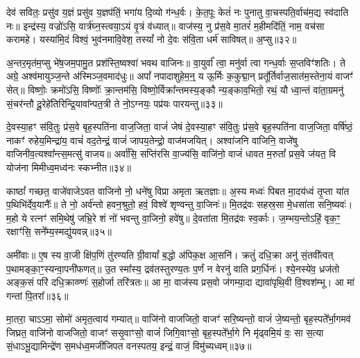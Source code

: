 {}

देव॑ सवितः॒ प्रसु॑व य॒ज्ञं प्रसु॑व य॒ज्ञप॑तिं॒ भगा॑य दि॒व्यो ग॑न्ध॒र्वः। के॒त॒पूः केतं॑ नः पुनातु वा॒चस्पति॒र्वाच॑म॒द्य स्व॑दाति नः॥ इन्द्र॑स्य॒ वज्रो॑\-ऽसि॒ वार्त्र॑घ्न॒स्त्वया॒\-ऽयं वृ॒त्रं व॑ध्यात्॥ वाज॑स्य॒ नु प्र॑स॒वे मा॒तरं॑ म॒हीमदि॑तिं॒ नाम॒ वच॑सा करामहे। यस्या॑मि॒दं विश्वं॒ भुव॑नमावि॒वेश॒ तस्यां᳚ नो दे॒वः स॑वि॒ता धर्म॑ साविषत्॥ अ॒प्सु॥३२॥

अ॒न्तर॒मृत॑म॒प्सु भे॑ष॒जम॒पामु॒त प्रश॑स्ति॒ष्वश्वा॑ भवथ वाजिनः॥ वा॒युर्वा᳚ त्वा॒ मनु॑र्वा त्वा गन्ध॒र्वाः स॒प्तविꣳ॑शतिः। ते अग्रे॒ अश्व॑मायुञ्ज॒न्ते अ॑स्मिञ्ज॒वमाद॑धुः॥ अपां᳚ नपादाशुहेम॒न्॒ य ऊ॒र्मिः क॒कुद्मा॒न् प्रतू᳚र्तिर्वाज॒सात॑म॒स्तेना॒यं वाजꣳ॑ सेत्॥ विष्णोः॒ क्रमो॑\-ऽसि॒ विष्णोः᳚ क्रा॒न्तम॑सि॒ विष्णो॒र्विक्रा᳚न्तमस्य॒ङ्कौ न्य॒ङ्काव॒भितो॒ रथं॒ यौ ध्वा॒न्तं वा॑ता॒ग्रमनु॑ सं॒चर॑न्तौ दू॒रेहे॑तिरिन्द्रि॒यावा᳚न्पत॒त्री ते नो॒\-ऽग्नयः॒ पप्र॑यः पारयन्तु॥३३॥

{\anuvakamend[{अ॒प्सु न्य॒ङ्कौ पञ्च॑दश च॥७॥}]}

दे॒वस्या॒हꣳ स॑वि॒तुः प्र॑स॒वे बृह॒स्पति॑ना वाज॒जिता॒ वाजं॑ जेषं दे॒वस्या॒हꣳ स॑वि॒तुः प्र॑स॒वे बृह॒स्पति॑ना वाज॒जिता॒ वर्\mbox{}षि॑ष्ठं॒ नाकꣳ॑ रुहेय॒मिन्द्रा॑य॒ वाचं॑ वद॒तेन्द्रं॒ वाजं॑ जापय॒तेन्द्रो॒ वाज॑मजयित्। अश्वा॑जनि वाजिनि॒ वाजे॑षु वाजिनीव॒त्यश्वा᳚न्त्स॒मत्सु॑ वाजय॥ अर्वा॑सि॒ सप्ति॑रसि वा॒ज्य॑सि॒ वाजि॑नो॒ वाजं॑ धावत म॒रुतां᳚ प्रस॒वे ज॑यत॒ वि योज॑ना मिमीध्व॒मध्व॑नः स्कभ्नीत॥३४॥

काष्ठां᳚ गच्छत॒ वाजे॑वाजे\-ऽवत वाजिनो नो॒ धने॑षु विप्रा अमृता ऋतज्ञाः॥ अ॒स्य मध्वः॑ पिबत मा॒दय॑ध्वं तृ॒प्ता या॑त प॒थिभि॑र्देव॒यानैः᳚॥ ते नो॒ अर्व॑न्तो हवन॒श्रुतो॒ हवं॒ विश्वे॑ शृण्वन्तु वा॒जिनः॑॥ मि॒तद्र॑वः सहस्र॒सा मे॒धसा॑ता सनि॒ष्यवः॑। म॒हो ये रत्नꣳ॑ समि॒थेषु॑ जभ्रि॒रे शं नो॑ भवन्तु वा॒जिनो॒ हवे॑षु॥ दे॒वता॑ता मि॒तद्र॑वः स्व॒र्काः। ज॒म्भय॒न्तो\-ऽहिं॒ वृक॒ꣳ॒ रक्षाꣳ॑सि॒ सने᳚म्य॒स्मद्यु॑यवन्न्॥३५॥

अमी॑वाः॥ ए॒ष स्य वा॒जी क्षि॑प॒णिं तु॑रण्यति ग्री॒वायां᳚ ब॒द्धो अ॑पिक॒क्ष आ॒सनि॑। क्रतुं॑ दधि॒क्रा अनु॑ सं॒तवी᳚त्वत् प॒थामङ्का॒ꣳ॒स्यन्वा॒पनी॑फणत्॥ उ॒त स्मा᳚स्य॒ द्रव॑तस्तुरण्य॒तः प॒र्णं न वेरनु॑ वाति प्रग॒र्धिनः॑। श्ये॒नस्ये॑व॒ ध्रज॑तो अङ्क॒सं परि॑ दधि॒क्राव्ण्णः॑ स॒होर्जा तरि॑त्रतः॥ आ मा॒ वाज॑स्य प्रस॒वो ज॑गम्या॒दा द्यावा॑पृथि॒वी वि॒श्वश॑म्भू। आ मा॑ गन्तां पि॒तरा᳚॥३६॥

मा॒तरा॒ चा\-ऽ\-ऽमा॒ सोमो॑ अमृत॒त्वाय॑ गम्यात्॥ वाजि॑नो वाजजितो॒ वाजꣳ॑ सरि॒ष्यन्तो॒ वाजं॑ जे॒ष्यन्तो॒ बृह॒स्पते᳚र्भा॒गमव॑ जिघ्रत॒ वाजि॑नो वाजजितो॒ वाजꣳ॑ ससृ॒वाꣳसो॒ वाजं॑ जिगि॒वाꣳसो॒ बृह॒स्पते᳚र्भा॒गे नि मृ॑ढ्वमि॒यं वः॒ सा स॒त्या सं॒धा\-ऽभू॒द्यामिन्द्रे॑ण स॒मध॑ध्व॒मजी॑जिपत वनस्पतय॒ इन्द्रं॒ वाजं॒ विमु॑च्यध्वम्॥३७॥

